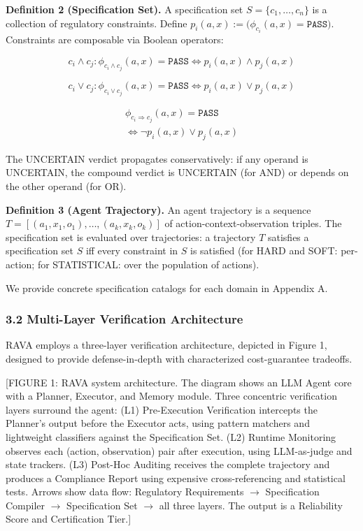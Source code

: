 \documentclass[
]{article}
\begin{document}
\textbf{Definition 2 (Specification Set).} A specification set $S = \{c_1, \ldots, c_n\}$ is a collection of regulatory constraints. Define $p_i(a,x):=\big(\phi_{c_i}(a,x)=\texttt{PASS}\big)$. Constraints are composable via Boolean operators:

\[
c_i \wedge c_j : \phi_{c_i \wedge c_j}(a,x)=\texttt{PASS}
\iff p_i(a,x)\wedge p_j(a,x)
\]

\[
c_i \vee c_j : \phi_{c_i \vee c_j}(a,x)=\texttt{PASS}
\iff p_i(a,x)\vee p_j(a,x)
\]

\[
\begin{aligned}
\phi_{c_i \Rightarrow c_j}(a,x)=\texttt{PASS}\\
\iff \neg p_i(a,x)\vee p_j(a,x)
\end{aligned}
\]

The UNCERTAIN verdict propagates conservatively: if any operand is UNCERTAIN, the compound verdict is UNCERTAIN (for AND) or depends on the other operand (for OR).

\textbf{Definition 3 (Agent Trajectory).} An agent trajectory is a sequence $T = [(a_1, x_1, o_1), \ldots, (a_k, x_k, o_k)]$ of action-context-observation triples. The specification set is evaluated over trajectories: a trajectory $T$ satisfies a specification set $S$ iff every constraint in $S$ is satisfied (for HARD and SOFT: per-action; for STATISTICAL: over the population of actions).

We provide concrete specification catalogs for each domain in Appendix A.

\hypertarget{32-multi-layer-verification-architecture}{%
\subsubsection{3.2 Multi-Layer Verification Architecture}\label{32-multi-layer-verification-architecture}}

RAVA employs a three-layer verification architecture, depicted in Figure 1, designed to provide defense-in-depth with characterized cost-guarantee tradeoffs.

{[}FIGURE 1: RAVA system architecture. The diagram shows an LLM Agent core with a Planner, Executor, and Memory module. Three concentric verification layers surround the agent: (L1) Pre-Execution Verification intercepts the Planner's output before the Executor acts, using pattern matchers and lightweight classifiers against the Specification Set. (L2) Runtime Monitoring observes each (action, observation) pair after execution, using LLM-as-judge and state trackers. (L3) Post-Hoc Auditing receives the complete trajectory and produces a Compliance Report using expensive cross-referencing and statistical tests. Arrows show data flow: Regulatory Requirements $\rightarrow$ Specification Compiler $\rightarrow$ Specification Set $\rightarrow$ all three layers. The output is a Reliability Score and Certification Tier.{]}
\end{document}
